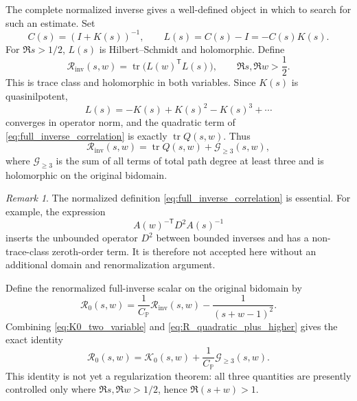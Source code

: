 \documentclass[11pt]{amsart}
\numberwithin{equation}{section}
\theoremstyle{plain}
\theoremstyle{definition}
\theoremstyle{remark}
\newtheorem{remark}[theorem]{Remark}
\newcommand{\tr}{\operatorname{tr}}
\begin{document}
The complete normalized inverse gives a well-defined object in which to search for such an estimate.  Set
\begin{equation}
C(s)=(I+K(s))^{-1},
\qquad
L(s)=C(s)-I=-C(s)K(s).
\label{eq:normalized_inverse_remainder}
\end{equation}
For $\Re s>1/2$, $L(s)$ is Hilbert--Schmidt and holomorphic.  Define
\begin{equation}
\mathcal R_{\mathrm{inv}}(s,w)=\tr\bigl(L(w)^{\mathsf T}L(s)\bigr),
\qquad \Re s,\Re w>\frac12.
\label{eq:full_inverse_correlation}
\end{equation}
This is trace class and holomorphic in both variables.  Since $K(s)$ is quasinilpotent,
\begin{equation}
L(s)=-K(s)+K(s)^2-K(s)^3+\cdots
\label{eq:L_path_expansion}
\end{equation}
converges in operator norm, and the quadratic term of \eqref{eq:full_inverse_correlation} is exactly $\tr Q(s,w)$.  Thus
\begin{equation}
\mathcal R_{\mathrm{inv}}(s,w)=\tr Q(s,w)+\mathcal G_{\ge3}(s,w),
\label{eq:R_quadratic_plus_higher}
\end{equation}
where $\mathcal G_{\ge3}$ is the sum of all terms of total path degree at least three and is holomorphic on the original bidomain.

\begin{remark}
\label{rem:why_normalized_R}
The normalized definition \eqref{eq:full_inverse_correlation} is essential.  For example, the expression
\begin{equation*}
A(w)^{-\mathsf T}D^2A(s)^{-1}
\end{equation*}
inserts the unbounded operator $D^2$ between bounded inverses and has a non-trace-class zeroth-order term.  It is therefore not accepted here without an additional domain and renormalization argument.
\end{remark}

Define the renormalized full-inverse scalar on the original bidomain by
\begin{equation}
\mathcal R_0(s,w)=
\frac{1}{C_{\mathbb P}}\mathcal R_{\mathrm{inv}}(s,w)
-\frac{1}{(s+w-1)^2}.
\label{eq:R0_definition}
\end{equation}
Combining \eqref{eq:K0_two_variable} and \eqref{eq:R_quadratic_plus_higher} gives the exact identity
\begin{equation}
\boxed{\ 
\mathcal R_0(s,w)
=\mathcal K_0(s,w)
+\frac{1}{C_{\mathbb P}}\mathcal G_{\ge3}(s,w).
\ }
\label{eq:R0_exact_decomposition}
\end{equation}
This identity is not yet a regularization theorem: all three quantities are presently controlled only where $\Re s,\Re w>1/2$, hence $\Re(s+w)>1$.
\end{document}
